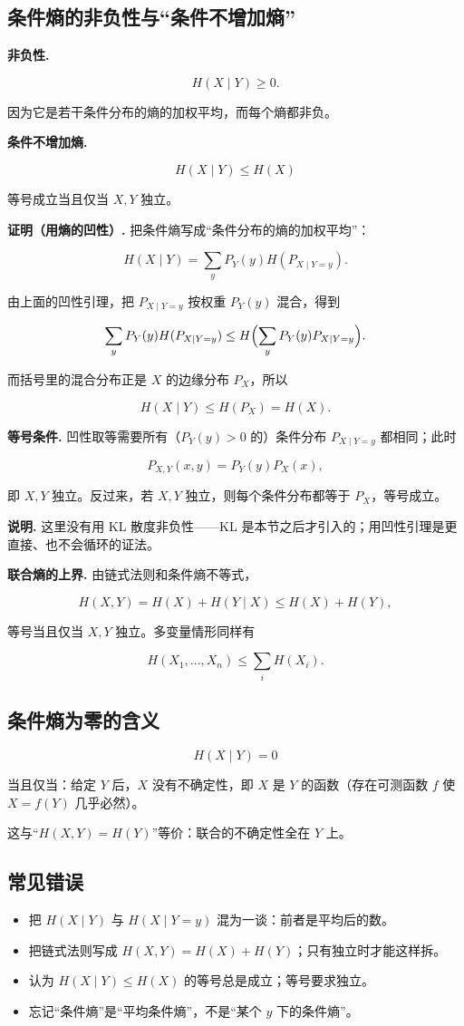 \subsection{条件熵的非负性与“条件不增加熵”}


\textbf{非负性.}

\[
H(X\mid Y)\ge0.
\]

因为它是若干条件分布的熵的加权平均，而每个熵都非负。

\textbf{条件不增加熵.}

\[
\boxed{
H(X\mid Y)\le H(X)
}
\]

等号成立当且仅当 $X,Y$ 独立。

\textbf{证明（用熵的凹性）.} 把条件熵写成“条件分布的熵的加权平均”：

\[
H(X\mid Y)
=\sum_yP_Y(y)H(P_{X\mid Y=y}).
\]

由上面的凹性引理，把 $P_{X\mid Y=y}$ 按权重 $P_Y(y)$ 混合，得到

\[
\sum_yP_Y(y)H(P_{X\mid Y=y})
\le
H\Bigl(\sum_yP_Y(y)P_{X\mid Y=y}\Bigr).
\]

而括号里的混合分布正是 $X$ 的边缘分布 $P_X$，所以

\[
H(X\mid Y)\le H(P_X)=H(X).
\]

\textbf{等号条件.} 凹性取等需要所有（$P_Y(y)>0$ 的）条件分布 $P_{X\mid Y=y}$ 都相同；此时

\[
P_{X,Y}(x,y)=P_Y(y)P_X(x),
\]

即 $X,Y$ 独立。反过来，若 $X,Y$ 独立，则每个条件分布都等于 $P_X$，等号成立。

\textbf{说明.} 这里没有用 KL 散度非负性——KL 是本节之后才引入的；用凹性引理是更直接、也不会循环的证法。

\textbf{联合熵的上界.} 由链式法则和条件熵不等式，

\[
H(X,Y)=H(X)+H(Y\mid X)\le H(X)+H(Y),
\]

等号当且仅当 $X,Y$ 独立。多变量情形同样有

\[
H(X_1,\dots,X_n)\le\sum_iH(X_i).
\]

\subsection{条件熵为零的含义}


\[
H(X\mid Y)=0
\]

当且仅当：给定 $Y$ 后，$X$ 没有不确定性，即 $X$ 是 $Y$ 的函数（存在可测函数 $f$ 使 $X=f(Y)$ 几乎必然）。

这与“$H(X,Y)=H(Y)$”等价：联合的不确定性全在 $Y$ 上。

\subsection{常见错误}


\begin{itemize}
\item 把 $H(X\mid Y)$ 与 $H(X\mid Y=y)$ 混为一谈：前者是平均后的数。
\item 把链式法则写成 $H(X,Y)=H(X)+H(Y)$；只有独立时才能这样拆。
\item 认为 $H(X\mid Y)\le H(X)$ 的等号总是成立；等号要求独立。
\item 忘记“条件熵”是“平均条件熵”，不是“某个 $y$ 下的条件熵”。
\end{itemize}
